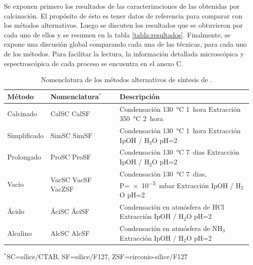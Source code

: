 	 Se exponen primero los resultados de las caracterizaciones de las \pdm\space obtenidas por calcinación. El propósito de ésto es tener datos de referencia para comparar con los métodos alternativos. Luego se discuten los resultados que se obtuvieron por cada uno de ellos y se resumen en la tabla \ref{tabla:resultados}. Finalmente, se expone una discusión global comparando cada una de las técnicas, para cada uno de los métodos. Para facilitar la lectura, la información detallada microscópica y espectroscópica de cada proceso se encuentra en el anexo C.
	 
	  	 \begin{table}[h!] 
		 	 \caption[Tratamientos alternativos de síntesis de \pdm]{Nomenclatura de los métodos alternativos de síntesis de \pdm.}
			 \begin{tabular}{>{\raggedright\arraybackslash}m{1.9cm}>{\centering\arraybackslash}m{1cm}>{\raggedright\arraybackslash}m{0.9cm}>{\raggedright\arraybackslash}m{6.62cm}} 
			 \toprule
				 Método   &  Nomenclatura$^*$&  & Descripción \\ \midrule
				 Calcinado & CalSC CalSF& &  Condensación \SI{130}{\celsius} \SI{1}{hora}\hspace{2cm} Extracción \SI{350}{\celsius} \SI{2}{hora}\hspace{2cm} \\ \midrule
				 Simplificado & SimSC SimSF& &  Condensación \SI{130}{\celsius} \SI{1}{hora}\hspace{2cm} Extracción IpOH / H$_2$O pH=2 \\ \midrule
				 Prolongado & ProSC ProSF& & Condensación \SI{130}{\celsius} \SI{7}{dias}\hspace{2cm} Extracción IpOH / H$_2$O pH=2 \\ \midrule				
				 Vacío & VacSC VacSF VacZSF& &  Condensación \SI{130}{\celsius} \SI{7}{dias}, P=\SI{e-5}{\milli\bar}\hspace{2cm} Extracción IpOH / H$_2$O pH=2 \\ \midrule
				 Ácido & ÁciSC ÁciSF& &  Condensación en atmósfera de HCl\hspace{2cm} Extracción IpOH / H$_2$O pH=2 \\ \midrule
				 Alcalino & AlcSC AlcSF& & Condensación en atmósfera de NH$_3$\hspace{2cm} Extracción IpOH / H$_2$O pH=2 \\ 
				\bottomrule
				   \end{tabular}\vspace*{2pt}
		    	  	\footnotesize{$^*$SC=sílice/CTAB, SF=sílice/F127, ZSF=circonio-sílice/F127}
				   	\label{tabla:tratamientos}
				   \end{table}
	
